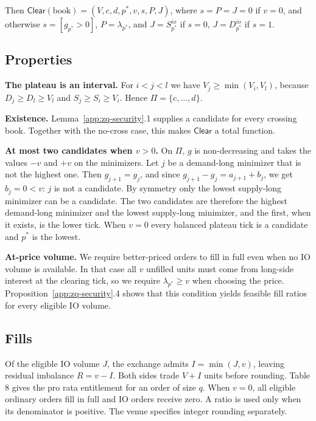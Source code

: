Then \(\mathsf{Clear}(\text{book}) = (V, c, d, p^*, v, s, P, J)\), where \(s = P = J = 0\) if \(v = 0\), and otherwise \(s = [g_{p^*} > 0]\), \(P = \lambda_{p^*}\), and \(J = S^{io}_{p^*}\) if \(s = 0\), \(J = D^{io}_{p^*}\) if \(s = 1\).

\subsection{Properties}

\textbf{The plateau is an interval.} For \(i < j < l\) we have \(V_j \ge \min(V_i, V_l)\), because \(D_j \ge D_l \ge V_l\) and \(S_j \ge S_i \ge V_i\). Hence \(\Pi = \{c, \ldots, d\}\).

\textbf{Existence.} Lemma~\ref{app:zq-security}.1 supplies a candidate for every crossing book. Together with the no-cross case, this makes \(\mathsf{Clear}\) a total function.

\textbf{At most two candidates when \(v > 0\).} On \(\Pi\), \(g\) is non-decreasing and takes the values \(-v\) and \(+v\) on the minimizers. Let \(j\) be a demand-long minimizer that is not the highest one. Then \(g_{j+1} = g_j\), and since \(g_{j+1} - g_j = a_{j+1} + b_j\), we get \(b_j = 0 < v\): \(j\) is not a candidate. By symmetry only the lowest supply-long minimizer can be a candidate. The two candidates are therefore the highest demand-long minimizer and the lowest supply-long minimizer, and the first, when it exists, is the lower tick. When \(v = 0\) every balanced plateau tick is a candidate and \(p^*\) is the lowest.

\textbf{At-price volume.} We require better-priced orders to fill in full even when no IO volume is available. In that case all \(v\) unfilled units must come from long-side interest at the clearing tick, so we require \(\lambda_{p^*}\ge v\) when choosing the price. Proposition~\ref{app:zq-security}.4 shows that this condition yields feasible fill ratios for every eligible IO volume.

\subsection{Fills}
\label{app:zq-fills}

Of the eligible IO volume \(J\), the exchange admits \(I=\min(J,v)\), leaving residual imbalance \(R=v-I\). Both sides trade \(V+I\) units before rounding. Table 8 gives the pro rata entitlement for an order of size \(q\). When \(v=0\), all eligible ordinary orders fill in full and IO orders receive zero. A ratio is used only when its denominator is positive. The venue specifies integer rounding separately.

